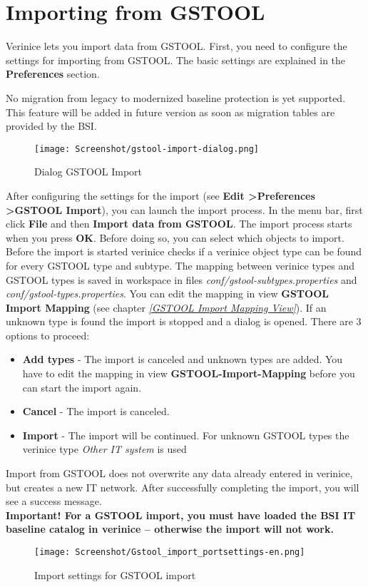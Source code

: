 \documentclass[a4paper,10pt]{book}
\begin{document}
\section{Importing from GSTOOL} \label{Importing from GSTOOL}
Verinice lets you import data from GSTOOL. First, you need to configure the settings for importing from GSTOOL.
The basic settings are explained in the \textbf{Preferences} section.

No migration from legacy to modernized baseline protection is yet supported.
This feature will be added in future version as soon as
migration tables are provided by the BSI.

\begin{figure}[htb!]
  \centering
  \texttt{[image: Screenshot/gstool-import-dialog.png]}
  \caption{\label{Dialog GSTOOL Import} Dialog GSTOOL Import}
\end{figure}

After configuring the settings for the import (see \textbf{Edit
\textgreater}{\textbf{Preferences \textgreater}}\textbf{\textsc{GSTOOL} Import}), you can launch the import process.
In the menu bar, first click \textbf{File} and then \textbf{Import data from GSTOOL}.
The import process starts when you press \textbf{OK}. Before doing so, you can select which objects to import.
Before the import is started verinice checks if a verinice object type can be found for every GSTOOL type and subtype. The mapping between verinice types and GSTOOL types is saved in workspace in files \textit{conf/gstool-subtypes.properties} and \textit{conf/gstool-types.properties}. You can edit the mapping in view \textbf{GSTOOL Import Mapping} (see chapter {\em \ref{GSTOOL Import Mapping View}}). If an unknown type is found the import is stopped and a dialog is opened. There are 3 options to proceed:
\begin{itemize}
 \item \textbf{Add types} - The import is canceled and unknown types are added. You have to edit the mapping in view \textbf{GSTOOL-Import-Mapping} before you can start the import again.
 \item \textbf{Cancel} - The import is canceled.
 \item \textbf{Import} - The import will be continued. For unknown GSTOOL types the verinice type \textit{Other IT system} is used
\end{itemize}
Import from GSTOOL does not overwrite any data already entered in verinice, but creates a new IT network. After
successfully completing the import, you will see a success message.
\newline\\
\textbf{Important! For a GSTOOL import, you
must have loaded the BSI IT baseline catalog in verinice – otherwise the import will not work.}
\newline\\
\begin{figure}[htb!]
  \centering
  \texttt{[image: Screenshot/Gstool\_import\_portsettings-en.png]}
  \caption{\label{Import settings for GSTOOL import} Import settings for GSTOOL import}
\end{figure}
\end{document}
